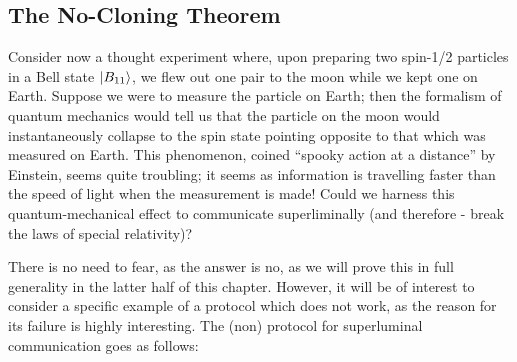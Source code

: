 \subsection{The No-Cloning Theorem}
Consider now a thought experiment where, upon preparing two spin-1/2 particles in a Bell state $\lvert B_{11} \rangle$, we flew out one pair to the moon while we kept one on Earth. Suppose we were to measure the particle on Earth; then the formalism of quantum mechanics would tell us that the particle on the moon would instantaneously collapse to the spin state pointing opposite to that which was measured on Earth. This phenomenon, coined ``spooky action at a distance'' by Einstein, seems quite troubling; it seems as information is travelling faster than the speed of light when the measurement is made! Could we harness this quantum-mechanical effect to communicate superliminally (and therefore - break the laws of special relativity)?

There is no need to fear, as the answer is no, as we will prove this in full generality in the latter half of this chapter. However, it will be of interest to consider a specific example of a protocol which does not work, as the reason for its failure is highly interesting. The (non) protocol for superluminal communication goes as follows:

